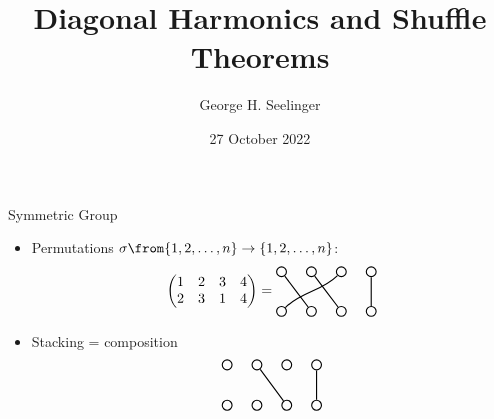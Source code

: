 \documentclass{beamer}
\title[Shuffle Theorems]{Diagonal Harmonics and Shuffle Theorems} %
\author[George H. Seelinger]{George H. Seelinger} %
\institute[UMich] %
{
  \medskip
\textit{ghseeli@umich.edu}\\ %
\medskip
  joint with Jonah Blasiak, Mark Haiman, Jennifer Morse, and Anna
  Pun\\
  \medskip
ISU Algebra Seminar %
}
\date{27 October 2022} %
\newcounter{c}
\begin{document}
\begin{frame}
 \titlepage 
\end{frame}
\begin{frame}{Symmetric Group}
  \begin{itemize}
  \item Permutations \(\sigma \from \{1,2,\ldots,n\} \to \{1,2,\ldots,n\}\):\pause \[
\left(
  \begin{matrix}
    1 & 2 & 3 & 4\\
    2 & 3 & 1 & 4 
  \end{matrix}
\right) = 
      \begin{tikzpicture}[scale = 0.5,thick, baseline={(0,-1ex/2)}] 
        \tikzstyle{vertex} = [shape = circle, minimum size = 7pt, inner sep = 1pt] 
        \node[vertex] (G--4) at (4.5, -1) [shape = circle, draw] {}; 
        \node[vertex] (G-4) at (4.5, 1) [shape = circle, draw] {}; 
        \node[vertex] (G--3) at (3.0, -1) [shape = circle, draw] {}; 
        \node[vertex] (G-2) at (1.5, 1) [shape = circle, draw] {}; 
        \node[vertex] (G--2) at (1.5, -1) [shape = circle, draw] {}; 
        \node[vertex] (G-1) at (0.0, 1) [shape = circle, draw] {}; 
        \node[vertex] (G--1) at (0.0, -1) [shape = circle, draw] {}; 
        \node[vertex] (G-3) at (3.0, 1) [shape = circle, draw] {}; 
        \draw[] (G-4) .. controls +(0, -1) and +(0, 1) .. (G--4); 
        \draw[] (G-2) .. controls +(0.75, -1) and +(-0.75, 1) .. (G--3); 
        \draw[] (G-1) .. controls +(0.75, -1) and +(-0.75, 1) .. (G--2); 
        \draw[] (G-3) .. controls +(-1, -1) and +(1, 1) .. (G--1); 
      \end{tikzpicture}
    \] \pause
  \item Stacking = composition \pause \[
      \begin{tikzpicture}[scale = 0.5,thick, baseline={(0,-3ex)}] 
        \tikzstyle{vertex} = [shape = circle, minimum size = 7pt, inner sep = 1pt] 
        \node[vertex] (G--4) at (4.5, -1) [shape = circle, draw] {}; 
        \node[vertex] (G-4) at (4.5, 1) [shape = circle, draw] {}; 
        \node[vertex] (G--3) at (3.0, -1) [shape = circle, draw] {}; 
        \node[vertex] (G-2) at (1.5, 1) [shape = circle, draw] {}; 
        \node[vertex] (G--2) at (1.5, -1) [shape = circle, draw] {}; 
        \node[vertex] (G-1) at (0.0, 1) [shape = circle, draw] {}; 
        \node[vertex] (G--1) at (0.0, -1) [shape = circle, draw] {}; 
        \node[vertex] (G-3) at (3.0, 1) [shape = circle, draw] {}; 
        \draw[] (G-4) .. controls +(0, -1) and +(0, 1) .. (G--4); 
        \draw[] (G-2) .. controls +(0.75, -1) and +(-0.75, 1) .. (G--3); 

\end{tikzpicture}\]
\end{itemize}
\end{frame}
\end{document}
